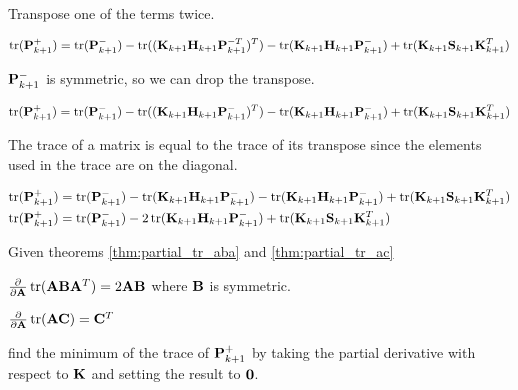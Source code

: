 Transpose one of the terms twice.

\begin{equation*}
  \operatorname{tr}(\mathbf{P}_{k+1}^+) = \operatorname{tr}(\mathbf{P}_{k+1}^-) -
    \operatorname{tr}((\mathbf{K}_{k+1}\mathbf{H}_{k+1}\mathbf{P}_{k+1}^{-T})^T) -
    \operatorname{tr}(\mathbf{K}_{k+1}\mathbf{H}_{k+1}\mathbf{P}_{k+1}^-) +
    \operatorname{tr}(\mathbf{K}_{k+1}\mathbf{S}_{k+1}\mathbf{K}_{k+1}^T)
\end{equation*}

$\mathbf{P}_{k+1}^-$ is symmetric, so we can drop the transpose.

\begin{equation*}
  \operatorname{tr}(\mathbf{P}_{k+1}^+) = \operatorname{tr}(\mathbf{P}_{k+1}^-) -
    \operatorname{tr}((\mathbf{K}_{k+1}\mathbf{H}_{k+1}\mathbf{P}_{k+1}^-)^T) -
    \operatorname{tr}(\mathbf{K}_{k+1}\mathbf{H}_{k+1}\mathbf{P}_{k+1}^-) +
    \operatorname{tr}(\mathbf{K}_{k+1}\mathbf{S}_{k+1}\mathbf{K}_{k+1}^T)
\end{equation*}

The trace of a matrix is equal to the trace of its transpose since the elements
used in the trace are on the diagonal.

\begin{align*}
  \operatorname{tr}(\mathbf{P}_{k+1}^+) &= \operatorname{tr}(\mathbf{P}_{k+1}^-) -
    \operatorname{tr}(\mathbf{K}_{k+1}\mathbf{H}_{k+1}\mathbf{P}_{k+1}^-) -
    \operatorname{tr}(\mathbf{K}_{k+1}\mathbf{H}_{k+1}\mathbf{P}_{k+1}^-) +
    \operatorname{tr}(\mathbf{K}_{k+1}\mathbf{S}_{k+1}\mathbf{K}_{k+1}^T) \\
  \operatorname{tr}(\mathbf{P}_{k+1}^+) &= \operatorname{tr}(\mathbf{P}_{k+1}^-) -
    2\operatorname{tr}(\mathbf{K}_{k+1}\mathbf{H}_{k+1}\mathbf{P}_{k+1}^-) +
    \operatorname{tr}(\mathbf{K}_{k+1}\mathbf{S}_{k+1}\mathbf{K}_{k+1}^T)
\end{align*}

Given theorems \ref{thm:partial_tr_aba} and \ref{thm:partial_tr_ac}

\begin{theorem}
  $\frac{\partial}{\partial\mathbf{A}}\operatorname{tr}(\mathbf{A}\mathbf{B}\mathbf{A}^T) =
    2\mathbf{A}\mathbf{B}$ where $\mathbf{B}$ is symmetric.
  \label{thm:partial_tr_aba}
\end{theorem}

\begin{theorem}
  $\frac{\partial}{\partial\mathbf{A}}\operatorname{tr}(\mathbf{A}\mathbf{C}) = \mathbf{C}^T$
  \label{thm:partial_tr_ac}
\end{theorem}

find the minimum of the trace of $\mathbf{P}_{k+1}^+$ by taking the partial
derivative with respect to $\mathbf{K}$ and setting the result to $\mathbf{0}$.

